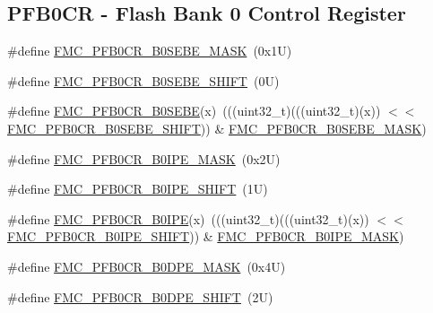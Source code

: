\subsection*{P\+F\+B0\+CR -\/ Flash Bank 0 Control Register}
\begin{DoxyCompactItemize}
\item 
\#define \mbox{\hyperlink{group___f_m_c___register___masks_ga9eede1bc45bf3cbaf00b4e9960f5e7eb}{F\+M\+C\+\_\+\+P\+F\+B0\+C\+R\+\_\+\+B0\+S\+E\+B\+E\+\_\+\+M\+A\+SK}}~(0x1\+U)
\item 
\#define \mbox{\hyperlink{group___f_m_c___register___masks_gac7bd1c5a4c5f35eb2d02351977e6a274}{F\+M\+C\+\_\+\+P\+F\+B0\+C\+R\+\_\+\+B0\+S\+E\+B\+E\+\_\+\+S\+H\+I\+FT}}~(0\+U)
\item 
\#define \mbox{\hyperlink{group___f_m_c___register___masks_ga7ef26c8091ac909b1b5628e741e53f77}{F\+M\+C\+\_\+\+P\+F\+B0\+C\+R\+\_\+\+B0\+S\+E\+BE}}(x)~(((uint32\+\_\+t)(((uint32\+\_\+t)(x)) $<$$<$ \mbox{\hyperlink{group___f_m_c___register___masks_gac7bd1c5a4c5f35eb2d02351977e6a274}{F\+M\+C\+\_\+\+P\+F\+B0\+C\+R\+\_\+\+B0\+S\+E\+B\+E\+\_\+\+S\+H\+I\+FT}})) \& \mbox{\hyperlink{group___f_m_c___register___masks_ga9eede1bc45bf3cbaf00b4e9960f5e7eb}{F\+M\+C\+\_\+\+P\+F\+B0\+C\+R\+\_\+\+B0\+S\+E\+B\+E\+\_\+\+M\+A\+SK}})
\item 
\#define \mbox{\hyperlink{group___f_m_c___register___masks_gab46173be15cdda210e83a041f8eeb809}{F\+M\+C\+\_\+\+P\+F\+B0\+C\+R\+\_\+\+B0\+I\+P\+E\+\_\+\+M\+A\+SK}}~(0x2\+U)
\item 
\#define \mbox{\hyperlink{group___f_m_c___register___masks_ga9fccb996200782cf4a1ec8d2418da2e5}{F\+M\+C\+\_\+\+P\+F\+B0\+C\+R\+\_\+\+B0\+I\+P\+E\+\_\+\+S\+H\+I\+FT}}~(1\+U)
\item 
\#define \mbox{\hyperlink{group___f_m_c___register___masks_gac9938eb8b3ad20c4ca552dc70770b1de}{F\+M\+C\+\_\+\+P\+F\+B0\+C\+R\+\_\+\+B0\+I\+PE}}(x)~(((uint32\+\_\+t)(((uint32\+\_\+t)(x)) $<$$<$ \mbox{\hyperlink{group___f_m_c___register___masks_ga9fccb996200782cf4a1ec8d2418da2e5}{F\+M\+C\+\_\+\+P\+F\+B0\+C\+R\+\_\+\+B0\+I\+P\+E\+\_\+\+S\+H\+I\+FT}})) \& \mbox{\hyperlink{group___f_m_c___register___masks_gab46173be15cdda210e83a041f8eeb809}{F\+M\+C\+\_\+\+P\+F\+B0\+C\+R\+\_\+\+B0\+I\+P\+E\+\_\+\+M\+A\+SK}})
\item 
\#define \mbox{\hyperlink{group___f_m_c___register___masks_gaff35af9c8bc3c5cf2f6bf9dd76253a02}{F\+M\+C\+\_\+\+P\+F\+B0\+C\+R\+\_\+\+B0\+D\+P\+E\+\_\+\+M\+A\+SK}}~(0x4\+U)
\item 
\#define \mbox{\hyperlink{group___f_m_c___register___masks_gabe5b35383e6d2198f45bc66429b0ce61}{F\+M\+C\+\_\+\+P\+F\+B0\+C\+R\+\_\+\+B0\+D\+P\+E\+\_\+\+S\+H\+I\+FT}}~(2\+U)

\end{DoxyCompactItemize}
